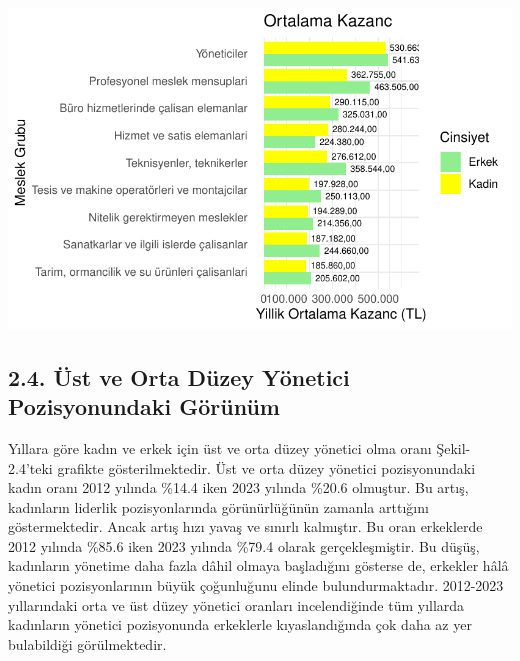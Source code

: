 \documentclass[
  11pt,
  a4paper,
  DIV=11,
  numbers=noendperiod]{scrartcl}
\begin{document}
\includegraphics{project_files/figure-pdf/unnamed-chunk-4-1.pdf}

\subsection{2.4. Üst ve Orta Düzey Yönetici Pozisyonundaki
Görünüm}\label{uxfcst-ve-orta-duxfczey-yuxf6netici-pozisyonundaki-guxf6ruxfcnuxfcm}

Yıllara göre kadın ve erkek için üst ve orta düzey yönetici olma oranı
Şekil-2.4'teki grafikte gösterilmektedir. Üst ve orta düzey yönetici
pozisyonundaki kadın oranı 2012 yılında \%14.4 iken 2023 yılında \%20.6
olmuştur. Bu artış, kadınların liderlik pozisyonlarında görünürlüğünün
zamanla arttığını göstermektedir. Ancak artış hızı yavaş ve sınırlı
kalmıştır. Bu oran erkeklerde 2012 yılında \%85.6 iken 2023 yılında
\%79.4 olarak gerçekleşmiştir. Bu düşüş, kadınların yönetime daha fazla
dâhil olmaya başladığını gösterse de, erkekler hâlâ yönetici
pozisyonlarının büyük çoğunluğunu elinde bulundurmaktadır. 2012-2023
yıllarındaki orta ve üst düzey yönetici oranları incelendiğinde tüm
yıllarda kadınların yönetici pozisyonunda erkeklerle kıyaslandığında çok
daha az yer bulabildiği görülmektedir.
\end{document}
